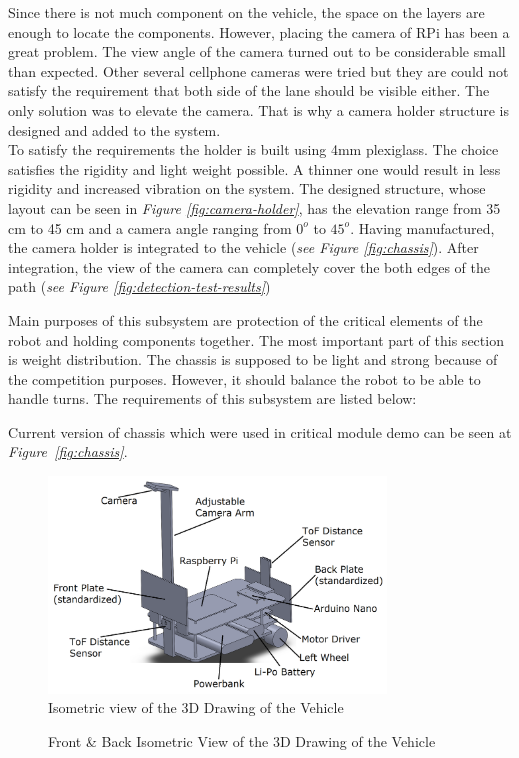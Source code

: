 \documentclass[a4paper,12pt]{article}
\begin{document}
\begin{enumerate}
\begin{enumerate}
	Since there is not much component on the vehicle, the space on the layers are enough to locate the components. However, placing the camera of RPi has been a great problem. The view angle of the camera turned out to be considerable small than expected. Other several cellphone cameras were tried but they are could not satisfy the requirement that both side of the lane should be visible either. The only solution was to elevate the camera. That is why a camera holder structure is designed and added to the system.\\	
	
	To satisfy the requirements the holder is built using 4mm plexiglass. The choice satisfies the rigidity and light weight possible. A thinner one would result in less rigidity and increased vibration on the system. The designed structure, whose layout can be seen in \textit{Figure \ref{fig:camera-holder}}, has the elevation range from 35 cm to 45 cm and a camera angle ranging from $0^o$ to $45^o$. Having manufactured, the camera holder is integrated to the vehicle (\textit{see Figure \ref{fig:chassis}}). After integration, the view of the camera can completely cover the both edges of the path (\textit{see Figure \ref{fig:detection-test-results}})
	
	Main purposes of this subsystem are protection of the critical elements of the robot and holding components together. The most important part of this section is weight distribution. The chassis is supposed to be light and strong because of the competition purposes. However, it should balance the robot to be able to handle turns. The requirements of this subsystem are listed below:

	Current version of chassis which were used in critical module demo can be seen at \textit{Figure~\ref{fig:chassis}}.
	
	
		\begin{figure}[h]
			\includegraphics[width=0.8\textwidth,center]{images/chassis1}
			\caption{Isometric view of the 3D Drawing of the Vehicle \label{fig:isom} }
		\end{figure}
			\begin{figure}[H]
				\setlength{\unitlength}{\textwidth} 
				\centering
				\caption{\label{fig:isom2} Front \& Back Isometric View of the 3D Drawing of the Vehicle}
			\end{figure}
				

\end{enumerate}
\end{enumerate}
\end{document}

